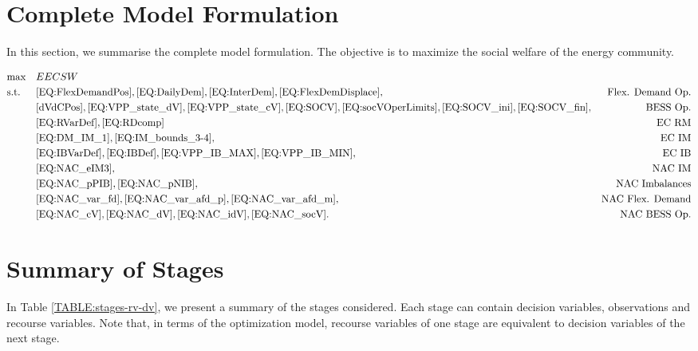 \documentclass{article}
\begin{document}
\section{Complete Model Formulation}
\label{SEC:CompleteModelFormulation}

In this section, we summarise the complete model formulation. The objective is to maximize the social welfare of the energy community.

\begin{align*}
\notag & \text{max} & & EECSW \\
\notag & \text{s.t.} & & \eqref{EQ:FlexDemandPos}, \eqref{EQ:DailyDem}, \eqref{EQ:InterDem}, \eqref{EQ:FlexDemDisplace},  & \text{Flex. Demand Op.} \\
\notag & & & \eqref{dVdCPos}, \eqref{EQ:VPP_state_dV}, \eqref{EQ:VPP_state_cV}, \eqref{EQ:SOCV}, \eqref{EQ:socVOperLimits}, \eqref{EQ:SOCV_ini}, \eqref{EQ:SOCV_fin}, & \text{BESS Op.} \\
\notag & & & \eqref{EQ:RVarDef}, \eqref{EQ:RDcomp}  & \text{EC RM} \\
\notag & & & \eqref{EQ:DM_IM_1}, \eqref{EQ:IM_bounds_3-4}, & \text{EC IM} \\
\notag & & & \eqref{EQ:IBVarDef}, \eqref{EQ:IBDef}, \eqref{EQ:VPP_IB_MAX}, \eqref{EQ:VPP_IB_MIN}, & \text{EC IB} \\
\notag & & & \eqref{EQ:NAC_eIM3}, & \text{NAC IM} \\
\notag & & & \eqref{EQ:NAC_pPIB}, \eqref{EQ:NAC_pNIB}, & \text{NAC Imbalances} \\
\notag & & & \eqref{EQ:NAC_var_fd}, \eqref{EQ:NAC_var_afd_p}, \eqref{EQ:NAC_var_afd_m}, & \text{NAC Flex. Demand} \\
\notag & & & \eqref{EQ:NAC_cV}, \eqref{EQ:NAC_dV}, \eqref{EQ:NAC_idV}, \eqref{EQ:NAC_socV}. & \text{NAC BESS Op.} \\
\end{align*}

\section{Summary of Stages}

In Table \ref{TABLE:stages-rv-dv}, we present a summary of the stages considered. Each stage can contain decision variables, observations and recourse variables. Note that, in terms of the optimization model, recourse variables of one stage are equivalent to decision variables of the next stage.
\end{document}

